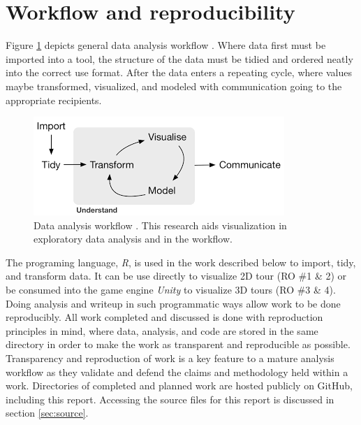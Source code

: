 \documentclass{monashthesis}
\begin{document}
\section{Workflow and
reproducibility}\label{workflow-and-reproducibility}

Figure \ref{fig:dataanalysisworkflow} depicts general data analysis
workflow \autocite{wickham_r_2016}. Where data first must be imported
into a tool, the structure of the data must be tidied and ordered neatly
into the correct use format. After the data enters a repeating cycle,
where values maybe transformed, visualized, and modeled with
communication going to the appropriate recipients.





\begin{figure}

{\centering \includegraphics[width=1\linewidth]{./figures/data_analysis_workflow} 

}

\caption{Data analysis workflow
\autocite{wickham_r_2016}. This research aids visualization in
exploratory data analysis and in the workflow.}\label{fig:dataanalysisworkflow}
\end{figure}

The programing language, \emph{R}, is used in the work described below
to import, tidy, and transform data. It can be use directly to visualize
2D tour (RO \#1 \& 2) or be consumed into the game engine \emph{Unity}
to visualize 3D tours (RO \#3 \& 4). Doing analysis and writeup in such
programmatic ways allow work to be done reproducibly. All work completed
and discussed is done with reproduction principles in mind, where data,
analysis, and code are stored in the same directory in order to make the
work as transparent and reproducible as possible. Transparency and
reproduction of work is a key feature to a mature analysis workflow as
they validate and defend the claims and methodology held within a work.
Directories of completed and planned work are hosted publicly on GitHub,
including this report. Accessing the source files for this report is
discussed in section \ref{sec:source}.
\end{document}
